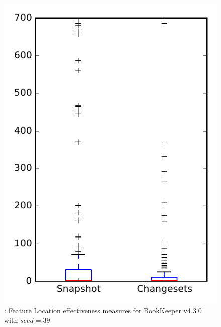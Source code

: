 
\begin{figure}
\centering
\includegraphics[height=0.4\textheight]{figures/flt_seed/rq1_bookkeeper_39}
\caption{\rone: Feature Location effectiveness measures for BookKeeper v4.3.0 with $seed=39$}
\label{fig:flt_seed:rq1:bookkeeper}
\end{figure}
